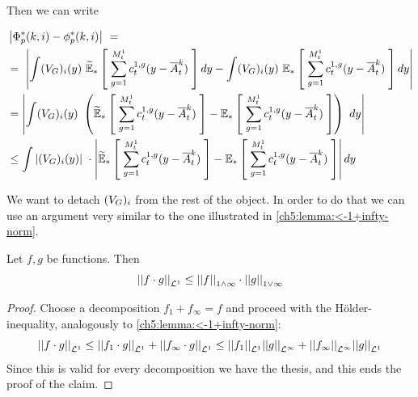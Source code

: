 	Then we can write
	
	\begin{equation}
		\label{ch5:in-LLN2:norm-of-rv}
		\begin{aligned}
			&\norm{
				\Phi_p^\ast(k,i) - \phi_p^\ast(k,i)
			}\
			=
			\\
			& 
			=\
			\norm{
				\int
				(\genAttraction)_i (y)\
				\ETFoot{\ast}{
					\sum _{g = 1}^{\hmactive_t^1}
					\cdens_t^{1,g}
					(y - \mfamba_t^k)
				}
				dy
				-
				\int
				(\genAttraction)_i (y)\
				\EFoot{\ast}{
					\sum _{g = 1}^{\hmactive_t^1}
					\cdens_t^{1,g}
					(y - \mfamba_t^k)
				}
				dy
			}
			\\
			& =
			\norm{
				\int
				(\genAttraction)_i (y)\
				\left(
				\ETFoot
				{\ast}{
					\sum _{g = 1}^{\hmactive_t^1}
					\cdens_t^{1,g}
					(y - \mfamba_t^k)
				}
				-
				\EFoot
				{\ast}{
					\sum _{g = 1}^{\hmactive_t^1}
					\cdens_t^{1,g}
					(y - \mfamba_t^k)
				}
				\right)\
				dy
			}
			\\
			&\leq
			\int
			\norm{(\genAttraction)_i (y)}\
			\cdot
			\norm{
				\ETFoot{\ast}{
					\sum _{g = 1}^{\hmactive_t^1}
					\cdens_t^{1,g}
					(y - \mfamba_t^k)
				}
				-
				\EFoot
				{\ast}{
					\sum _{g = 1}^{\hmactive_t^1}
					\cdens_t^{1,g}
					(y - \mfamba_t^k)
				}
			}
			dy
		\end{aligned}
	\end{equation}
	
	We want to detach $(\genAttraction)_i$ from the rest of the object.
	In order to do that we can use an argument very similar to the one illustrated in \ref{ch5:lemma:<-1+infty-norm}.
	
	\begin{claim}
		Let $f,g$ be functions.
		Then
		\begin{equation}
			\Normp{\Lpspace^1}{f\cdot g} \leq \Norm{f}_{1 \wedge \infty} \cdot \Norm{g}_{1 \vee \infty}
		\end{equation}
	\end{claim}
	
	\begin{proof}
		Choose a decomposition $f_1 + f_\infty = f$ and proceed with the Hölder-inequality, analogously to \ref{ch5:lemma:<-1+infty-norm}:
		\begin{equation}
			\Normp{\Lpspace^1}{f\cdot g} \leq \Normp{\Lpspace^1}{f_1\cdot g} + \Normp{\Lpspace^1}{f_\infty\cdot g} \leq \Normp{\Lpspace^1}{f_1} \Normp{\Lpspace^\infty}{g} + \Normp{\Lpspace^\infty}{f_\infty} \Normp{\Lpspace^1}{g}
		\end{equation}
		Since this is valid for every decomposition we have the thesis, and this ends the proof of the claim.
	\end{proof}
	
